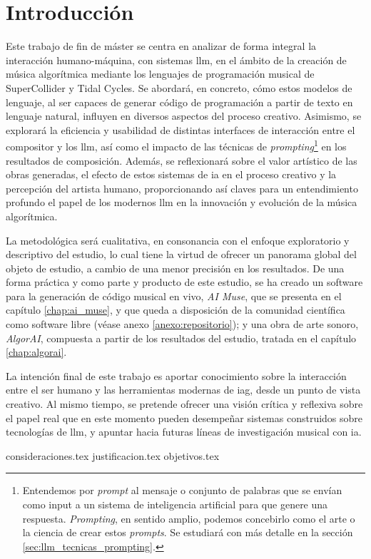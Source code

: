 \chapter{Introducción}



Este trabajo de fin de máster se centra en analizar de forma integral la interacción humano-máquina, con sistemas \gls{llm}, en el ámbito de la creación de música algorítmica mediante los lenguajes de programación musical de SuperCollider y Tidal Cycles. Se abordará, en concreto, cómo estos modelos de lenguaje, al ser capaces de generar código de programación a partir de texto en lenguaje natural, influyen en diversos aspectos del proceso creativo. Asimismo, se explorará la eficiencia y usabilidad de distintas interfaces de interacción entre el compositor y los \gls{llm}, así como el impacto de las técnicas de \emph{prompting}\footnote{Entendemos por \emph{prompt} al mensaje o conjunto de palabras que se envían como input a un sistema de inteligencia artificial para que genere una respuesta. \emph{Prompting}, en sentido amplio, podemos concebirlo como el arte o la ciencia de crear estos \emph{prompts}. Se estudiará con más detalle en la sección \ref{sec:llm_tecnicas_prompting}.} en los resultados de composición. Además, se reflexionará sobre el valor artístico de las obras generadas, el efecto de estos sistemas de \gls{ia} en el proceso creativo y la percepción del artista humano, proporcionando así claves para un entendimiento profundo el papel de los modernos \gls{llm} en la innovación y evolución de la música algorítmica.

La metodológica será cualitativa, en consonancia con el enfoque exploratorio y descriptivo del estudio, lo cual tiene la virtud de ofrecer un panorama global del objeto de estudio, a cambio de una menor precisión en los resultados. De una forma práctica y como parte y producto de este estudio, se ha creado un software para la generación de código musical en vivo, \emph{AI Muse}, que se presenta en el capítulo \ref{chap:ai_muse}, y que queda a disposición de la comunidad científica como software libre (véase anexo \ref{anexo:repositorio}); y una obra de arte sonoro, \emph{AlgorAI}, compuesta a partir de los resultados del estudio, tratada en el capítulo \ref{chap:algorai}.

La intención final de este trabajo es aportar conocimiento sobre la interacción entre el ser humano y las herramientas modernas de \gls{iag}, desde un punto de vista creativo. Al mismo tiempo, se pretende ofrecer una visión crítica y reflexiva sobre el papel real que en este momento pueden desempeñar sistemas construidos sobre tecnologías de \gls{llm}, y apuntar hacia futuras líneas de investigación musical con \gls{ia}.



{consideraciones.tex}
{justificacion.tex}
{objetivos.tex}